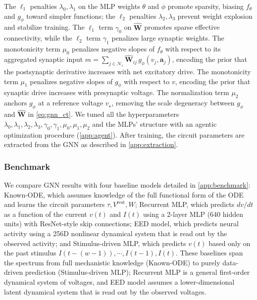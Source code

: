 \documentclass{article}
\def\stimbase{Stimulus-driven MLP}
\def\eedbase{EED model}
\def\mlpbase{Recurrent MLP}
\def\vrest{V^{\mathrm{rest}}}
\begin{document}
The $\ell_1$ penalties $\lambda_0,\lambda_1$ on the MLP weights $\theta$ and $\phi$ promote sparsity, biasing $f_\theta$ and $g_\phi$ toward simpler functions; the $\ell_2$ penalties $\lambda_2,\lambda_3$ prevent weight explosion and stabilize training. The $\ell_1$ term $\gamma_0$ on $\hat{\mathbf{W}}$ promotes sparse effective connectivity, while the $\ell_2$ term $\gamma_1$ penalizes large synaptic weights. The monotonicity term $\mu_0$ penalizes negative slopes of $f_\theta$ with respect to its aggregated synaptic input $m=\sum_{j\in\mathcal{N}_i}\hat{\mathbf{W}}_{ij}\,g_\phi(v_j,\mathbf{a}_j)$, encoding the prior that the postsynaptic derivative increases with net excitatory drive. The monotonicity term $\mu_1$ penalizes negative slopes of $g_\phi$ with respect to $v$, encoding the prior that synaptic drive increases with presynaptic voltage. The normalization term $\mu_2$ anchors $g_\phi$ at a reference voltage $v_\star$, removing the scale degeneracy between $g_\phi$ and $\hat{\mathbf{W}}$ in \cref{eq:gnn_ct}. We tuned all the hyperparameters $\lambda_0,\lambda_1,\lambda_2,\lambda_3,\gamma_0,\gamma_1,\mu_0,\mu_1,\mu_2$ and the MLPs' structure with an agentic optimization procedure (\cref{app:agent}). After training, the circuit parameters are extracted from the GNN as described in \cref{app:extraction}.


\subsubsection*{Benchmark}
We compare GNN results with four baseline models detailed in \cref{app:benchmark}: Known-ODE, which assumes knowledge of the full functional form of the ODE and learns the circuit parameters $\tau, \vrest, W$; \mlpbase, which predicts $dv/dt$ as a function of the current $v(t)$ and $I(t)$ using a 2-layer MLP (640 hidden units) with ResNet-style skip connections; \eedbase, which predicts neural activity using a 256D nonlinear dynamical system that is read out by the observed activity; and Stimulus-driven MLP, which predicts $v(t)$ based only on the past stimulus $I(t-(w-1)), \cdots, I(t-1), I(t)$. These baselines span the spectrum from full mechanistic knowledge (Known-ODE) to purely data-driven prediction (\stimbase); \mlpbase{} is a general first-order dynamical system of voltages, and \eedbase{} assumes a lower-dimensional latent dynamical system that is read out by the observed voltages.
\end{document}
